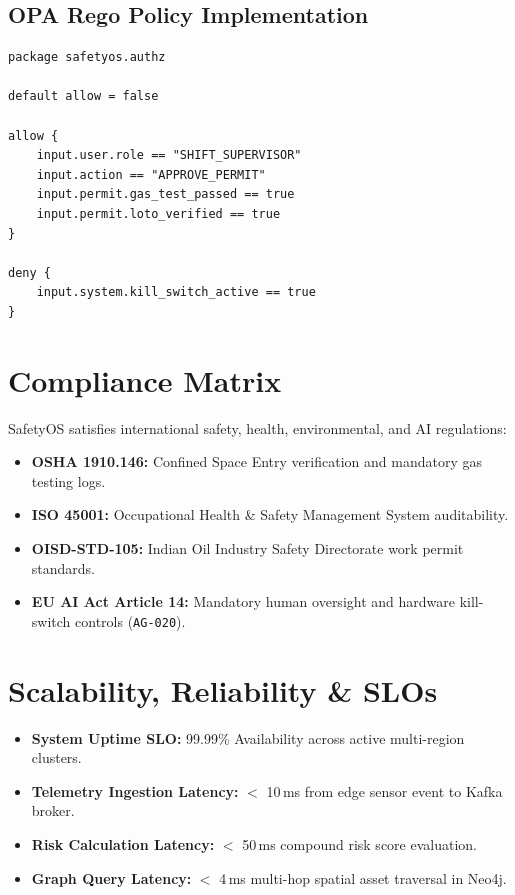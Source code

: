 \documentclass[11pt,a4paper]{article}
\begin{document}

\subsection{OPA Rego Policy Implementation}
\begin{lstlisting}[caption={Open Policy Agent Rego Authorization (policy.rego)}]
package safetyos.authz

default allow = false

allow {
    input.user.role == "SHIFT_SUPERVISOR"
    input.action == "APPROVE_PERMIT"
    input.permit.gas_test_passed == true
    input.permit.loto_verified == true
}

deny {
    input.system.kill_switch_active == true
}
\end{lstlisting}

\section{Compliance Matrix}
SafetyOS satisfies international safety, health, environmental, and AI regulations:
\begin{itemize}
    \item \textbf{OSHA 1910.146:} Confined Space Entry verification and mandatory gas testing logs.
    \item \textbf{ISO 45001:} Occupational Health \& Safety Management System auditability.
    \item \textbf{OISD-STD-105:} Indian Oil Industry Safety Directorate work permit standards.
    \item \textbf{EU AI Act Article 14:} Mandatory human oversight and hardware kill-switch controls (\texttt{AG-020}).
\end{itemize}

\section{Scalability, Reliability \& SLOs}
\begin{itemize}
    \item \textbf{System Uptime SLO:} 99.99\% Availability across active multi-region clusters.
    \item \textbf{Telemetry Ingestion Latency:} $<$ 10\,ms from edge sensor event to Kafka broker.
    \item \textbf{Risk Calculation Latency:} $<$ 50\,ms compound risk score evaluation.
    \item \textbf{Graph Query Latency:} $<$ 4\,ms multi-hop spatial asset traversal in Neo4j.
\end{itemize}
\end{document}
